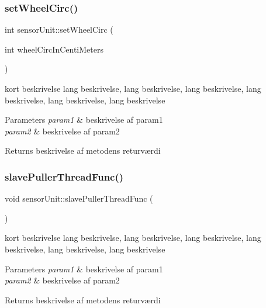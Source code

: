 \subsubsection{\texorpdfstring{set\+Wheel\+Circ()}{setWheelCirc()}}
{\footnotesize\ttfamily int sensor\+Unit\+::set\+Wheel\+Circ (\begin{DoxyParamCaption}\item[{int}]{wheel\+Circ\+In\+Centi\+Meters }\end{DoxyParamCaption})}



kort beskrivelse lang beskrivelse, lang beskrivelse, lang beskrivelse, lang beskrivelse, lang beskrivelse, lang beskrivelse 


\begin{DoxyParams}{Parameters}
{\em param1} & beskrivelse af param1 \\
\hline
{\em param2} & beskrivelse af param2 \\
\hline
\end{DoxyParams}
\begin{DoxyReturn}{Returns}
beskrivelse af metodens returværdi 
\end{DoxyReturn}
\mbox{\label{classsensorUnit_af597dff1d9bc84a5ab9b1b76ca38f00e}} 
\subsubsection{\texorpdfstring{slave\+Puller\+Thread\+Func()}{slavePullerThreadFunc()}}
{\footnotesize\ttfamily void sensor\+Unit\+::slave\+Puller\+Thread\+Func (\begin{DoxyParamCaption}{ }\end{DoxyParamCaption})}



kort beskrivelse lang beskrivelse, lang beskrivelse, lang beskrivelse, lang beskrivelse, lang beskrivelse, lang beskrivelse 


\begin{DoxyParams}{Parameters}
{\em param1} & beskrivelse af param1 \\
\hline
{\em param2} & beskrivelse af param2 \\
\hline
\end{DoxyParams}
\begin{DoxyReturn}{Returns}
beskrivelse af metodens returværdi 
\end{DoxyReturn}
\mbox{\label{classsensorUnit_af089bd3cff5b63b7bc287cff2a7fb90f}} 
